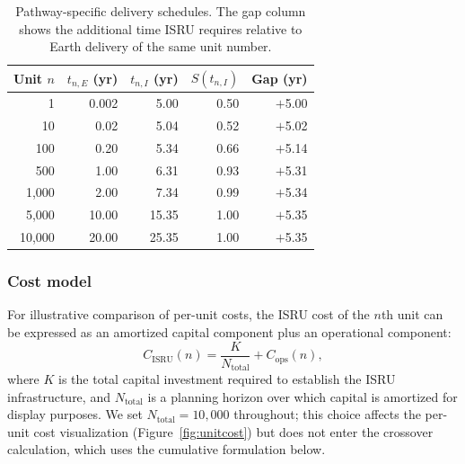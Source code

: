 \documentclass[preprint,12pt]{elsarticle}
\begin{document}
\begin{table}[htbp]
\centering
\caption{Pathway-specific delivery schedules. The gap column shows the additional time ISRU requires relative to Earth delivery of the same unit number.}
\label{tab:production_schedule}
\small
\begin{tabular}{@{}rrrrr@{}}
\toprule
Unit $n$ & $t_{n,E}$ (yr) & $t_{n,I}$ (yr) & $S(t_{n,I})$ & Gap (yr) \\
\midrule
1      & 0.002 & 5.00  & 0.50 & $+$5.00 \\
10     & 0.02  & 5.04  & 0.52 & $+$5.02 \\
100    & 0.20  & 5.34  & 0.66 & $+$5.14 \\
500    & 1.00  & 6.31  & 0.93 & $+$5.31 \\
1{,}000  & 2.00  & 7.34  & 0.99 & $+$5.34 \\
5{,}000  & 10.00 & 15.35 & 1.00 & $+$5.35 \\
10{,}000 & 20.00 & 25.35 & 1.00 & $+$5.35 \\
\bottomrule
\end{tabular}
\end{table}

\subsubsection{Cost model}

For illustrative comparison of per-unit costs, the ISRU cost of the $n$th unit can be expressed as an amortized capital component plus an operational component:
\begin{equation}
  C_{\mathrm{ISRU}}(n) = \frac{K}{N_{\mathrm{total}}} + C_{\mathrm{ops}}(n),
  \label{eq:isru_unit}
\end{equation}
where $K$ is the total capital investment required to establish the ISRU infrastructure, and $N_{\mathrm{total}}$ is a planning horizon over which capital is amortized for display purposes. We set $N_{\mathrm{total}} = 10{,}000$ throughout; this choice affects the per-unit cost visualization (Figure~\ref{fig:unitcost}) but does not enter the crossover calculation, which uses the cumulative formulation below.
\end{document}
